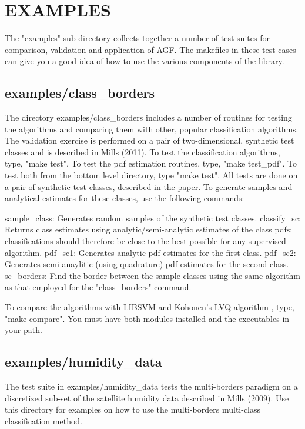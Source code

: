 \documentclass[12pt]{article}
\begin{document}
\section{EXAMPLES}

  The "examples" sub-directory collects together a number of test suites for comparison, validation and application of AGF.  The makefiles in these test cases can give you a good idea of how to use the various components of the library.

\subsection{examples/class_borders}

  The directory examples/class_borders includes a number of routines for testing the algorithms and comparing them with other, popular classification algorithms.  The validation exercise is performed on a pair of two-dimensional, synthetic test classes and is described in Mills (2011).  To test the classification algorithms, type, "make test".  To test the pdf estimation routines, type, "make test_pdf".  To test both from the bottom level directory, type "make test".  All tests are done on a pair of synthetic test classes, described in the paper.  To generate samples and analytical estimates for these classes, use the following commands:

  sample_class:	Generates random samples of the synthetic test classes.
  classify_sc:	Returns class estimates using analytic/semi-analytic estimates of the class pdfs; classifications should therefore be close to the best possible for any supervised algorithm.
  pdf_sc1:	Generates analytic pdf estimates for the first class.
  pdf_sc2:	Generates semi-anaylitic (using quadrature) pdf estimates for the second class.
  sc_borders:	Find the border between the sample classes using the same algorithm as that employed for the "class_borders" command.

  To compare the algorithms with LIBSVM \citep{Lin_Lin2011} and Kohonen's LVQ algorithm \citep{Kohonen2000}, type, "make compare".  You must have both modules installed and the executables in your path.


\subsection{examples/humidity_data}

The test suite in examples/humidity_data tests the multi-borders paradigm on a discretized sub-set of the satellite humidity data described in Mills (2009).  Use this directory for examples on how to use the multi-borders multi-class classification method.
\end{document}
